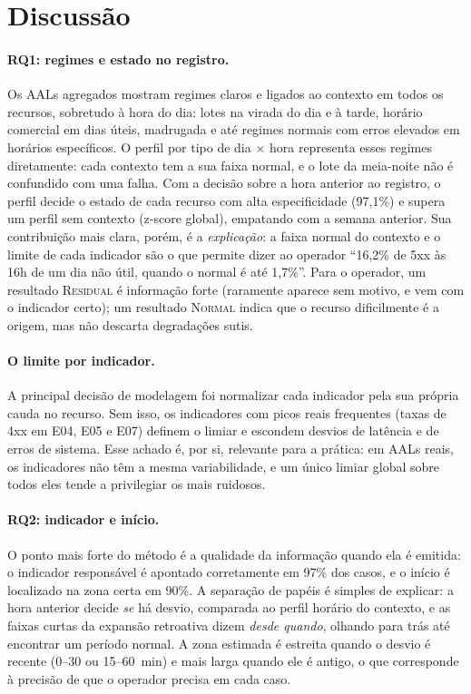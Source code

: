 \documentclass[sigconf,nonacm]{acmart}
\newcommand{\Normal}{\textsc{Normal}\xspace}
\newcommand{\Residual}{\textsc{Residual}\xspace}
\begin{document}
\section{Discussão}\label{sec:discussao}

\paragraph{RQ1: regimes e estado no registro.} Os AALs agregados mostram regimes claros e ligados ao contexto em todos os recursos, sobretudo à hora do dia: lotes na virada do dia e à tarde, horário comercial em dias úteis, madrugada e até regimes normais com erros elevados em horários específicos. O perfil por tipo de dia $\times$ hora representa esses regimes diretamente: cada contexto tem a sua faixa normal, e o lote da meia-noite não é confundido com uma falha. Com a decisão sobre a hora anterior ao registro, o perfil decide o estado de cada recurso com alta especificidade (97,1\%) e supera um perfil sem contexto (z-score global), empatando com a semana anterior. Sua contribuição mais clara, porém, é a \emph{explicação}: a faixa normal do contexto e o limite de cada indicador são o que permite dizer ao operador ``16,2\% de 5xx às 16h de um dia não útil, quando o normal é até 1,7\%''. Para o operador, um resultado \Residual é informação forte (raramente aparece sem motivo, e vem com o indicador certo); um resultado \Normal indica que o recurso dificilmente é a origem, mas não descarta degradações sutis.

\paragraph{O limite por indicador.} A principal decisão de modelagem foi normalizar cada indicador pela sua própria cauda no recurso. Sem isso, os indicadores com picos reais frequentes (taxas de 4xx em E04, E05 e E07) definem o limiar e escondem desvios de latência e de erros de sistema. Esse achado é, por si, relevante para a prática: em AALs reais, os indicadores não têm a mesma variabilidade, e um único limiar global sobre todos eles tende a privilegiar os mais ruidosos.

\paragraph{RQ2: indicador e início.} O ponto mais forte do método é a qualidade da informação quando ela é emitida: o indicador responsável é apontado corretamente em 97\% dos casos, e o início é localizado na zona certa em 90\%. A separação de papéis é simples de explicar: a hora anterior decide \emph{se} há desvio, comparada ao perfil horário do contexto, e as faixas curtas da expansão retroativa dizem \emph{desde quando}, olhando para trás até encontrar um período normal. A zona estimada é estreita quando o desvio é recente (0--30 ou 15--60~min) e mais larga quando ele é antigo, o que corresponde à precisão de que o operador precisa em cada caso.
\end{document}
